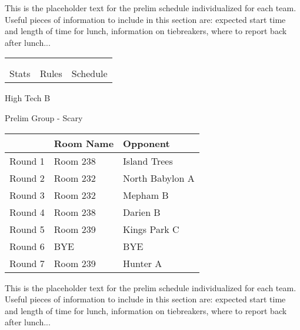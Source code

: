 \documentclass{article}%
\begin{document}
\vspace*{30pt}%
\linebreak%
This is the placeholder text for the prelim schedule individualized for each team. Useful pieces of information to include in this section are: expected start time and length of time for lunch, information on tiebreakers, where to report back after lunch...%
\vspace*{30pt}%
\newline%
%
\begin{tabularx}{\textwidth}{YYY}%
  &  &  \\%
\\%
Stats&Rules&Schedule\\%
\end{tabularx}%
\newpage%
%
\begin{center}%
\begin{Huge}%
High Tech B%
\end{Huge}%
\vspace*{12pt}%
\linebreak%
\begin{Large}%
Prelim Group {-} Scary%
\end{Large}%
\end{center}%
\vspace*{4pt}%
\begin{tabularx}{\textwidth}{|c|Y|Y|}%
\hline%
&Room Name&Opponent\\%
\hline%
Round 1&Room 238&Island Trees\\%
Round 2&Room 232&North Babylon A\\%
Round 3&Room 232&Mepham B\\%
Round 4&Room 238&Darien B\\%
Round 5&Room 239&Kings Park C\\%
Round 6&BYE&BYE\\%
Round 7&Room 239&Hunter A\\%
\hline%
\end{tabularx}%
\vspace*{30pt}%
\linebreak%
This is the placeholder text for the prelim schedule individualized for each team. Useful pieces of information to include in this section are: expected start time and length of time for lunch, information on tiebreakers, where to report back after lunch...%
\end{document}
